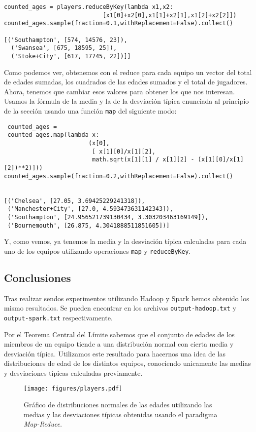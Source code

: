 \documentclass[11pt]{article}
\def\inline{\lstinline[basicstyle=\ttfamily,keywordstyle={}]}
\begin{document}
\begin{verbatim}
counted_ages = players.reduceByKey(lambda x1,x2:
                            [x1[0]+x2[0],x1[1]+x2[1],x1[2]+x2[2]])
counted_ages.sample(fraction=0.1,withReplacement=False).collect()

[('Southampton', [574, 14576, 23]),
  ('Swansea', [675, 18595, 25]),
  ('Stoke+City', [617, 17745, 22])]]
\end{verbatim}

Como podemos ver, obtenemos con el reduce para cada equipo un vector del total de edades sumadas, los cuadrados de las edades sumados y el total de jugadores. Ahora, tenemos que cambiar esos valores para obtener los que nos interesan. Usamos la fórmula de la media y la de la desviación típica enunciada al principio de la sección usando una función \inline{map} del siguiente modo:

\begin{verbatim}
 counted_ages =
 counted_ages.map(lambda x:
                        (x[0],
                         [ x[1][0]/x[1][2],
                         math.sqrt(x[1][1] / x[1][2] - (x[1][0]/x[1][2])**2)]))
counted_ages.sample(fraction=0.2,withReplacement=False).collect()


[('Chelsea', [27.05, 3.69425229241318]),
 ('Manchester+City', [27.0, 4.593473631142343]),
 ('Southampton', [24.956521739130434, 3.303203463169149]),
 ('Bournemouth', [26.875, 4.3041888511851605])]
\end{verbatim}

Y, como vemos, ya tenemos la media y la desviación típica calculadas para cada uno de los equipos utilizando operaciones \inline{map} y \inline{reduceByKey}.

\subsection{Conclusiones}

Tras realizar sendos experimentos utilizando Hadoop y Spark hemos obtenido los mismo resultados. Se pueden encontrar en los archivos \inline{output-hadoop.txt} y \inline{output-spark.txt} respectivamente.

Por el Teorema Central del Límite sabemos que el conjunto de edades de los miembros de un equipo tiende a una distribución normal con cierta media y desviación típica. Utilizamos este resultado para hacernos una idea de las distribuciones de edad de los distintos equipos, conociendo unicamente las medias y desviaciones típicas calculadas previamente.

\begin{figure}[H]
	\hspace{-1.5cm}\texttt{[image: figures/players.pdf]}
	\caption{Gráfico de distribuciones normales de las edades utilizando las medias y las desviaciones típicas obtenidas usando el paradigma \emph{Map-Reduce}.}
\end{figure}
\end{document}
